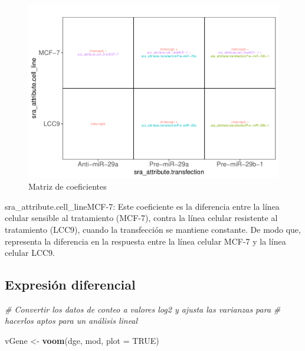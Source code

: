 \documentclass[
]{article}
\newenvironment{Shaded}{\begin{snugshade}}{\end{snugshade}}
\newcommand{\AttributeTok}[1]{\textcolor[rgb]{0.13,0.29,0.53}{#1}}
\newcommand{\CommentTok}[1]{\textcolor[rgb]{0.56,0.35,0.01}{\textit{#1}}}
\newcommand{\ConstantTok}[1]{\textcolor[rgb]{0.56,0.35,0.01}{#1}}
\newcommand{\FunctionTok}[1]{\textcolor[rgb]{0.13,0.29,0.53}{\textbf{#1}}}
\newcommand{\NormalTok}[1]{#1}
\newcommand{\OtherTok}[1]{\textcolor[rgb]{0.56,0.35,0.01}{#1}}
\begin{document}
\begin{figure}
\centering
\includegraphics{Proyecto_RNAseq_files/figure-latex/unnamed-chunk-12-1.pdf}
\caption{Matriz de coeficientes}
\end{figure}

sra\_attribute.cell\_lineMCF-7: Este coeficiente es la diferencia entre
la línea celular sensible al tratamiento (MCF-7), contra la línea
celular resistente al tratamiento (LCC9), cuando la transfección se
mantiene constante. De modo que, representa la diferencia en la
respuesta entre la línea celular MCF-7 y la línea celular LCC9.

\subsection{Expresión diferencial}\label{expresiuxf3n-diferencial}

\begin{Shaded}
\begin{Highlighting}[]
\CommentTok{\# Convertir los datos de conteo a valores log2 y ajusta las varianzas para }
\CommentTok{\# hacerlos aptos para un análisis lineal }

\NormalTok{vGene }\OtherTok{\textless{}{-}} \FunctionTok{voom}\NormalTok{(dge, mod, }\AttributeTok{plot =} \ConstantTok{TRUE}\NormalTok{)}
\end{Highlighting}
\end{Shaded}
\end{document}
